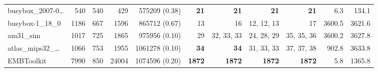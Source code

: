 \begin{table*}
\begin{tiny}
{{\begin{tabular}{lrrrrrrrrrr}
busybox\_2007-0\ldots & \num[text-series-to-math=true]{540} & \num[text-series-to-math=true]{540} & \num[text-series-to-math=true]{429} & \num[text-series-to-math=true]{575209} (\num[text-series-to-math=true]{0.38}) & \textbf{\num[text-series-to-math=true]{21}} & \textbf{\num[text-series-to-math=true]{21}} & \textbf{\num[text-series-to-math=true]{21}} & \textbf{\num[text-series-to-math=true]{21}} & 6.3 & 134.1\\
busybox-1\_18\_0 & \num[text-series-to-math=true]{1186} & \num[text-series-to-math=true]{667} & \num[text-series-to-math=true]{1596} & \num[text-series-to-math=true]{865712} (\num[text-series-to-math=true]{0.67}) & \num[text-series-to-math=true]{13} & \num[text-series-to-math=true]{16} & \num[text-series-to-math=true]{12}, \num[text-series-to-math=true]{12}, \num[text-series-to-math=true]{13} & \num[text-series-to-math=true]{17} & 3600.5 & 3621.6\\
am31\_sim & \num[text-series-to-math=true]{1017} & \num[text-series-to-math=true]{725} & \num[text-series-to-math=true]{1865} & \num[text-series-to-math=true]{975956} (\num[text-series-to-math=true]{0.10}) & \num[text-series-to-math=true]{29} & \num[text-series-to-math=true]{32}, \num[text-series-to-math=true]{33}, \num[text-series-to-math=true]{33} & \num[text-series-to-math=true]{24}, \num[text-series-to-math=true]{28}, \num[text-series-to-math=true]{29} & \num[text-series-to-math=true]{35}, \num[text-series-to-math=true]{35}, \num[text-series-to-math=true]{36} & 3600.2 & 3627.8\\
atlas\_mips32\_\ldots & \num[text-series-to-math=true]{1066} & \num[text-series-to-math=true]{753} & \num[text-series-to-math=true]{1955} & \num[text-series-to-math=true]{1061278} (\num[text-series-to-math=true]{0.10}) & \textbf{\num[text-series-to-math=true]{34}} & \textbf{\num[text-series-to-math=true]{34}} & \num[text-series-to-math=true]{31}, \num[text-series-to-math=true]{33}, \num[text-series-to-math=true]{33} & \num[text-series-to-math=true]{37}, \num[text-series-to-math=true]{37}, \num[text-series-to-math=true]{38} & 902.8 & 3633.8\\
EMBToolkit & \num[text-series-to-math=true]{7990} & \num[text-series-to-math=true]{850} & \num[text-series-to-math=true]{24004} & \num[text-series-to-math=true]{1074596} (\num[text-series-to-math=true]{0.20}) & \textbf{\num[text-series-to-math=true]{1872}} & \textbf{\num[text-series-to-math=true]{1872}} & \textbf{\num[text-series-to-math=true]{1872}} & \textbf{\num[text-series-to-math=true]{1872}} & 5.8 & 1365.8\\

\end{tabular}}}
\end{tiny}
\end{table*}
